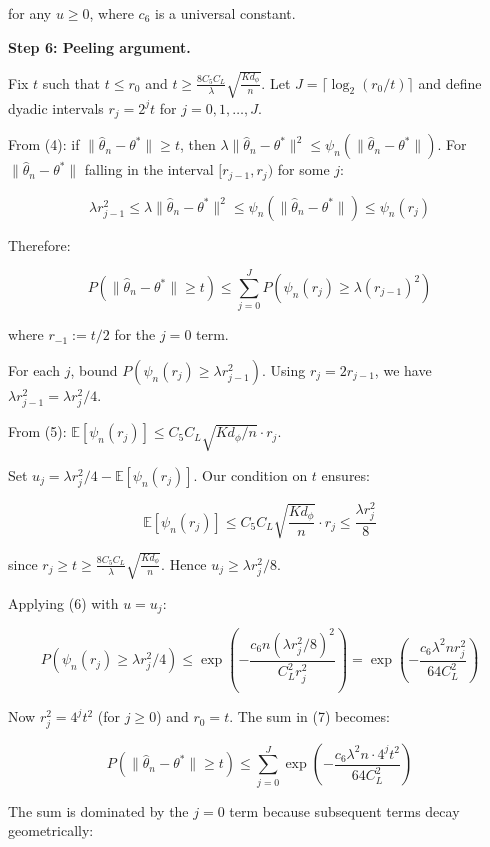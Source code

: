 \documentclass[
  12pt,
]{ctexart}
\begin{document}
for any \(u \geq 0\), where \(c_6\) is a universal constant.

\textbf{Step 6: Peeling argument.}

Fix \(t\) such that \(t \leq r_0\) and
\(t \geq \frac{8 C_5 C_L}{\lambda} \sqrt{\frac{K d_\phi}{n}}\). Let
\(J = \lceil \log_2(r_0/t) \rceil\) and define dyadic intervals
\(r_j = 2^j t\) for \(j = 0, 1, \dots, J\).

From (4): if \(\|\hat{\theta}_n - \theta^*\| \geq t\), then
\(\lambda \|\hat{\theta}_n - \theta^*\|^2 \leq \psi_n(\|\hat{\theta}_n - \theta^*\|)\).
For \(\|\hat{\theta}_n - \theta^*\|\) falling in the interval
\([r_{j-1}, r_j)\) for some \(j\):

\[\lambda r_{j-1}^2 \leq \lambda \|\hat{\theta}_n - \theta^*\|^2 \leq \psi_n(\|\hat{\theta}_n - \theta^*\|) \leq \psi_n(r_j)\]

Therefore:

\[P(\|\hat{\theta}_n - \theta^*\| \geq t) \leq \sum_{j=0}^J P\left(\psi_n(r_j) \geq \lambda (r_{j-1})^2\right) \tag{7}\]

where \(r_{-1} := t/2\) for the \(j=0\) term.

For each \(j\), bound \(P(\psi_n(r_j) \geq \lambda r_{j-1}^2)\). Using
\(r_j = 2r_{j-1}\), we have \(\lambda r_{j-1}^2 = \lambda r_j^2 / 4\).

From (5):
\(\mathbb{E}[\psi_n(r_j)] \leq C_5 C_L \sqrt{K d_\phi / n} \cdot r_j\).

Set \(u_j = \lambda r_j^2 / 4 - \mathbb{E}[\psi_n(r_j)]\). Our condition
on \(t\) ensures:

\[\mathbb{E}[\psi_n(r_j)] \leq C_5 C_L \sqrt{\frac{K d_\phi}{n}} \cdot r_j \leq \frac{\lambda r_j^2}{8}\]

since
\(r_j \geq t \geq \frac{8 C_5 C_L}{\lambda} \sqrt{\frac{K d_\phi}{n}}\).
Hence \(u_j \geq \lambda r_j^2 / 8\).

Applying (6) with \(u = u_j\):

\[P\left(\psi_n(r_j) \geq \lambda r_j^2 / 4\right) \leq \exp\left(-\frac{c_6 n (\lambda r_j^2 / 8)^2}{C_L^2 r_j^2}\right) = \exp\left(-\frac{c_6 \lambda^2 n r_j^2}{64 C_L^2}\right) \tag{8}\]

Now \(r_j^2 = 4^j t^2\) (for \(j \geq 0\)) and \(r_0 = t\). The sum in
(7) becomes:

\[P(\|\hat{\theta}_n - \theta^*\| \geq t) \leq \sum_{j=0}^J \exp\left(-\frac{c_6 \lambda^2 n \cdot 4^j t^2}{64 C_L^2}\right)\]

The sum is dominated by the \(j=0\) term because subsequent terms decay
geometrically:
\end{document}
